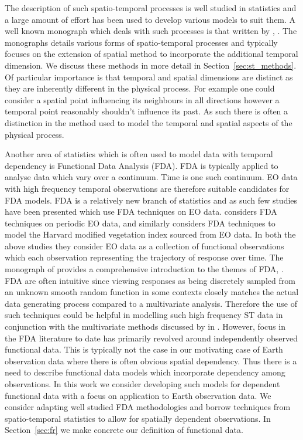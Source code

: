 The description of such spatio-temporal processes is well studied in statistics and a large amount of effort has been used to develop various models to suit them.
A well known monograph which deals with such processes is that written by \citeauthor{cressie_statistics_2011}, \cite{cressie_statistics_2011}.
The monographs details various forms of spatio-temporal processes and typically focuses on the extension of spatial method to incorporate the additional temporal dimension.
We discuss these methods in more detail in Section~\ref{sec:st_methods}.
Of particular importance is that temporal and spatial dimensions are distinct as they are inherently different in the physical process.
For example one could consider a spatial point influencing its neighbours in all directions however a temporal point reasonably shouldn't influence its past.
As such there is often a distinction in the method used to model the temporal and spatial aspects of the physical process.

Another area of statistics which is often used to model data with temporal dependency is Functional Data Analysis (FDA).
FDA is typically applied to analyse data which vary over a continuum.
Time is one such continuum.
EO data with high frequency temporal observations are therefore suitable candidates for FDA models.
FDA is a relatively new branch of statistics and as such few studies have been presented which use FDA techniques on EO data.
\citeauthor{liu_functional_2012} considers FDA techniques on periodic EO data, \citep{liu_functional_2012} and similarly \citeauthor{hooker_maximal_2015} considers FDA techniques to model the Harvard modified vegetation index sourced from EO data.
In both the above studies they consider EO data as a collection of functional observations which each observation representing the trajectory of response over time.
The monograph of \citeauthor{ramsay_functional_2010} provides a comprehensive introduction to the themes of FDA, \citep{ramsay_functional_2010}.
FDA are often intuitive since viewing responses as being discretely sampled from an unknown smooth random function in some contexts closely matches the actual data generating process compared to a multivariate analysis.
Therefore the use of such techniques could be helpful in modelling such high frequency ST data in conjunction with the multivariate methods discussed by \citeauthor{cressie_statistics_2011} in \citep{cressie_statistics_2011}.
However, focus in the FDA literature to date has primarily revolved around independently observed functional data.
This is typically not the case in our motivating case of Earth observation data where there is often obvious spatial dependency.
Thus there is a need to describe functional data models which incorporate dependency among observations.
In this work we consider developing such models for dependent functional data with a focus on application to Earth observation data.
We consider adapting well studied FDA methodologies and borrow techniques from spatio-temporal statistics to allow for spatially dependent observations.
In Section~\ref{sec:fr} we make concrete our definition of functional data. 

